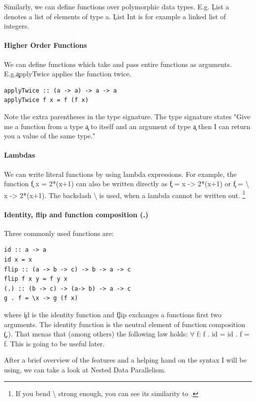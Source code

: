     Similarly, we can define functions over polymorphic data types.
    E.g. \c{List a} denotes a list of elements of type a. \c{List Int}
    is for example a linked list of integers.
  
  \paragraph{Higher Order Functions}
    We can define functions which take and pass entire functions as arguments.
    E.g.\c{applyTwice} applies the function twice.
    \begin{lstlisting}
applyTwice :: (a -> a) -> a -> a
applyTwice f x = f (f x)
    \end{lstlisting}
    Note the extra parentheses in the type signature. The type signature
    states "Give me a function from a type \c{a} to itself and an
    argument of type \c{a} then I can return you a value of the same type."
    
  \paragraph{Lambdas}
    We can write literal functions by using lambda expressions.
    For example, the function \c{f x = 2*(x+1)} can also be written
    directly as \c{f = \lam x -> 2*(x+1)} or \c{f = \textbackslash{} x -> 2*(x+1)}.
    The backslash \textbackslash{} is used, when a lambda cannot be written out.
    \footnote{If you bend \textbackslash{} strong enough, you can see its similarity to \lam.}
    
  \paragraph{Identity, flip and function composition (.)}
    Three commonly used functions are:
    
    \begin{lstlisting}
id :: a -> a
id x = x
flip :: (a -> b -> c) -> b -> a -> c
flip f x y = f y x
(.) :: (b -> c) -> (a-> b) -> a -> c
g . f = \x -> g (f x)
    \end{lstlisting}
    where \c{id} is the identity function and \c{flip} exchanges a functions
    first two arguments.
    The identity function is the neutral element of function composition \c{(.)}.
    That menas that (among others) the following law holds:
     \c{\textrm{$\forall$} f: f . id = id . f = f}. This is going to be useful later.

  After a brief overview of the features and a helping hand on the syntax
  I will be using, we can take a look at Nested Data Parallelism.

